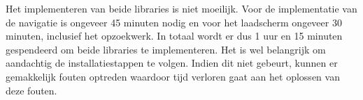 Het implementeren van beide libraries is niet moeilijk. Voor de implementatie van de navigatie 
is ongeveer 45 minuten nodig en voor het laadscherm ongeveer 30 minuten, inclusief het opzoekwerk. In totaal wordt er dus
1 uur en 15 minuten gespendeerd om beide libraries te implementeren. Het is wel belangrijk 
om aandachtig de installatiestappen te volgen. Indien dit niet gebeurt, kunnen er gemakkelijk fouten optreden 
waardoor tijd verloren gaat aan het oplossen van deze fouten.


